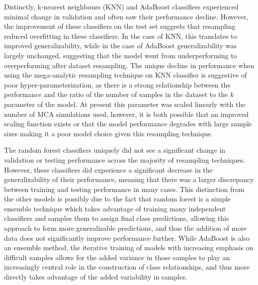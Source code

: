 \documentclass[10pt]{SelfArx} %
\begin{document}
Distinctly, k-nearest neighbours (KNN) and AdaBoost classifiers experienced minimal change in validation and often saw
their performance decline. However, the improvement of these classifiers on the test set suggests that resampling
reduced overfitting in these classifiers. In the case of KNN, this translates to improved generalizability, while in
the case of AdaBoost generalizability was largely unchanged, suggesting that the model went from underperforming to
overperforming after dataset resampling. The unique decline in performance when using the mega-analytic resampling
technique on KNN classifier is suggestive of poor hyper-parameterization, as there is a strong relationship between the
performance and the ratio of the number of samples in the dataset to the $k$ parameter of the model. At present this
parameter was scaled linearly with the number of MCA simulations used, however, it is both possible that an improved
scaling function exists or that the model performance degrades with large sample sizes making it a poor model choice
given this resampling technique.

The random forest classifiers uniquely did not see a significant change in validation or testing performance across the
majority of resampling techniques. However, these classifiers did experience a significant decrease in the
generalizability of their performance, meaning that there was a larger discrepancy between training and testing
performance in many cases. This distinction from the other models is possibly due to the fact that random forest is a
simple ensemble technique which takes advantage of training many independent classifiers and samples them to assign
final class predictions, allowing this approach to form more generalizable predictions, and thus the addition of more
data does not significantly improve performance further. While AdaBoost is also an ensemble method, the iterative
training of models with increasing emphasis on difficult samples allows for the added variance in those samples to play
an increasingly central role in the construction of class relationships, and thus more directly takes advantage of the
added variability in samples.
\end{document}
